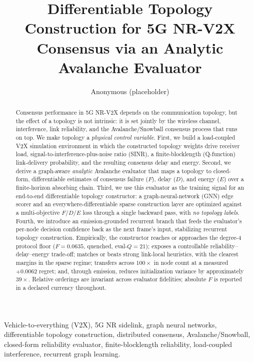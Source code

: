 \documentclass[journal]{IEEEtran}
\begin{document}
\title{Differentiable Topology Construction for 5G NR-V2X Consensus
via an Analytic Avalanche Evaluator}

\author{Anonymous (placeholder)}

\maketitle

\begin{abstract}
Consensus performance in 5G NR-V2X depends on the communication topology, but
the effect of a topology is not intrinsic: it is set jointly by the wireless
channel, interference, link reliability, and the Avalanche/Snowball consensus
process that runs on top. We make topology a \emph{physical control variable}.
First, we build a load-coupled V2X simulation environment in which the
constructed topology weights drive receiver load, signal-to-interference-plus-noise
ratio (SINR), a finite-blocklength (Q-function) link-delivery probability, and
the resulting consensus delay and energy. Second, we derive a graph-aware
\emph{analytic} Avalanche evaluator that maps a topology to closed-form,
differentiable estimates of consensus failure ($F$), delay ($D$), and energy
($E$) over a finite-horizon absorbing chain. Third, we use this evaluator as the
training signal for an end-to-end differentiable topology constructor: a
graph-neural-network (GNN) edge scorer and an everywhere-differentiable sparse
construction layer are optimized against a multi-objective $F$/$D$/$E$ loss
through a single backward pass, with \emph{no topology labels}. Fourth, we
introduce an emission-grounded recurrent branch that feeds the evaluator's
per-node decision confidence back as the next frame's input, stabilizing
recurrent topology construction. Empirically, the constructor reaches or
approaches the degree-4 protocol floor ($F=0.0635$, quenched, eval-$Q{=}21$);
exposes a controllable reliability--delay--energy trade-off; matches or beats
strong link-local heuristics, with the clearest margins in the sparse regime;
transfers across $100\times$ in node count at a measured $+0.0062$ regret; and,
through emission, reduces initialization variance by approximately $39\times$.
Relative orderings are invariant across evaluator fidelities; absolute $F$ is
reported in a declared currency throughout.
\end{abstract}

\begin{IEEEkeywords}
Vehicle-to-everything (V2X), 5G NR sidelink, graph neural networks,
differentiable topology construction, distributed consensus, Avalanche/Snowball,
closed-form reliability evaluator, finite-blocklength reliability, load-coupled
interference, recurrent graph learning.
\end{IEEEkeywords}
\end{document}
